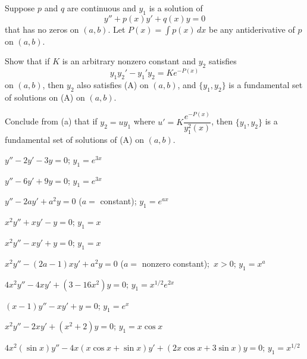 \begin{exerciselist}
Suppose $p$ and $q$ are continuous and $y_1$ is a solution
of
\[
y''+p(x)y'+q(x)y=0\tag{A}
\]
that has no zeros  on  $(a,b)$.
Let $P(x)=\int p(x)\,dx$ be any
antiderivative of $p$ on  $(a,b)$.
\begin{alist}
\item %
Show that if $K$ is an arbitrary nonzero constant and
$y_2$  satisfies
\[
y_1y_2'-y_1'y_2=Ke^{-P(x)}\tag{B}
\]
on $(a,b)$, then $y_2$ also satisfies (A)
on $(a,b)$, and $\{y_1,y_2\}$ is a fundamental set of solutions on
(A) on $(a,b)$.

\item %
Conclude from (a) that if $y_2=uy_1$ where
$u'=K\dfrac{e^{-P(x)}}{y_1^2(x)}$, then  $\{y_1,y_2\}$
is a fundamental set of solutions of (A)
on  $(a,b)$.
\end{alist}




\item\label{exer:5.1.10}$y''-2y'-3y=0$;  \quad  $y_1=e^{3x}$

\item\label{exer:5.1.11}$y''-6y'+9y=0$;  \quad  $y_1=e^{3x}$

\item\label{exer:5.1.12}%
$y''-2ay'+a^2y=0$\; ($a=$ constant);  \quad  $y_1=e^{ax}$

\item\label{exer:5.1.13}$x^2y''+xy'-y=0$;  \quad  $y_1=x$

\item\label{exer:5.1.14}$x^2y''-xy'+y=0$;  \quad $y_1=x$

\item\label{exer:5.1.15}$x^2y''-(2a-1)xy'+a^2y=0$\; ($a=$ nonzero constant);\, $x>0$;  \quad
$y_1=x^a$

\item\label{exer:5.1.16}$4x^2y''-4xy'+(3-16x^2)y=0$;  \quad  $y_1=x^{1/2}e^{2x}$

\item\label{exer:5.1.17}$(x-1)y''-xy'+y=0$;  \quad  $y_1=e^x$

\item\label{exer:5.1.18}$x^2y''-2xy'+(x^2+2)y=0$;  \quad  $y_1=x\cos x$

\item\label{exer:5.1.19}$4x^2(\sin x)y''-4x(x\cos x+\sin x)y'+(2x\cos x+3\sin x)y=0$;  \quad
$y_1=x^{1/2}$


\end{exerciselist}
